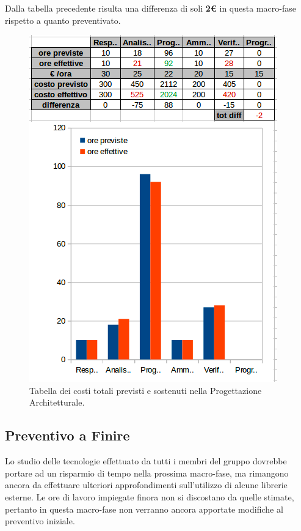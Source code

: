 Dalla tabella precedente risulta una differenza di soli \textbf{2€} in questa macro-fase rispetto a quanto preventivato. \\

\begin{figure}[h]
\begin{center}
\includegraphics[scale=0.70]{img/consuntivo-progarc-tot.png}
\caption{Tabella dei costi totali previsti e sostenuti nella Progettazione Architetturale.}
\end{center}
\end{figure}
\clearpage

\subsection{Preventivo a Finire}
 Lo studio delle tecnologie effettuato da tutti i membri del gruppo dovrebbe portare ad un risparmio di tempo nella prossima macro-fase, ma rimangono ancora da effettuare ulteriori approfondimenti sull'utilizzo di alcune librerie esterne. Le ore di lavoro impiegate finora non si discostano da quelle stimate,  pertanto in questa macro-fase non verranno ancora apportate modifiche al preventivo iniziale.






